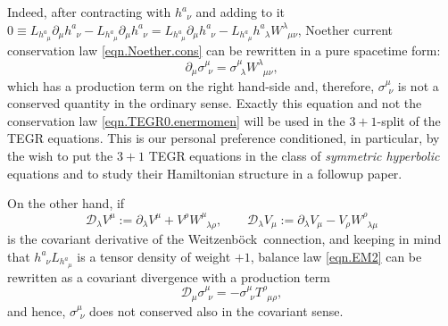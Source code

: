 \documentclass[
10pt, %
a4paper, %
oneside, %
headinclude,footinclude, %
BCOR5mm, %
]{scrartcl}
\newcommand{\pd}[1]{\partial_{#1}}
\newcommand{\tetrsymbol}{h}
\newcommand{\tetr}[2]{\tetrsymbol^{#1}_{\phantom{#1}#2}}
\newcommand{\DW}[1]{\mathcal{D}_{#1}} %
\newcommand{\Tors}[2]{T^{#1}_{\phantom{a}#2}}
\newcommand{\w}[2]{W^{#1}_{\phantom{#1}#2}}
\newcommand{\We}{Weitzenb\"ock}
\newcommand{\Laghodge}{L}%
\newcommand{\EMmat}[2]{\sigma^{#1}_{\ \,#2}}
\begin{document}
Indeed, after contracting with $ \tetr{a}{\nu} $ and adding to it $ 
0\equiv \Laghodge_{\tetr{a}{\mu}}\pd{\mu} \tetr{a}{\nu} - \Laghodge_{\tetr{a}{\mu}}\pd{\mu} 
\tetr{a}{\nu}  = \Laghodge_{\tetr{a}{\mu}}\pd{\mu} \tetr{a}{\nu} - \Laghodge_{\tetr{a}{\mu}} 
\tetr{a}{\lambda}\w{\lambda}{\mu\nu} $, Noether current conservation law 
\eqref{eqn.Noether.cons} can be rewritten in a pure 
spacetime 
form:	
\begin{equation}\label{eqn.EM2}
	\pd{\mu}\EMmat{\mu}{\nu} = \EMmat{\mu}{\lambda} 
	\w{\lambda}{\mu\nu},
\end{equation}
which has a production term on the right hand-side and, therefore, $ \EMmat{\mu}{\nu} $ is not 
a 
conserved 
quantity in the ordinary sense. Exactly this equation and not the conservation law 
\eqref{eqn.TEGR0.enermomen} will be used in the $ 3+1 $-split of the TEGR equations. This is our 
personal preference conditioned, in particular, by the wish to put the $ 3+1 $ TEGR equations in 
the class of \emph{symmetric hyperbolic} equations and to study their Hamiltonian structure 
\cite{SHTC-GENERIC-CMAT,PKG_Book2018} in a followup paper.

On the other hand, if 
\begin{equation}\label{eqn.cov.W}
	\DW{\lambda} V^{\mu} := \pd{\lambda} V^\mu + V^\rho \w{\mu}{\lambda\rho}, 
	\qquad 
	\DW{\lambda} V_{\mu} := \pd{\lambda} V_\mu - V_\rho \w{\rho}{\lambda\mu}
\end{equation}
is the covariant derivative of the \We\ connection, and 
keeping in mind that $ \tetr{a}{\nu}\Laghodge_{\tetr{a}{\mu}} $ is a tensor density of weight $ 
+1 
$, balance law \eqref{eqn.EM2} can be rewritten as a covariant divergence with a production term
\begin{equation*}\label{eqn.EM.cov}
	\DW{\mu}\EMmat{\mu}{\nu} = -\EMmat{\mu}{\nu} \Tors{\rho}{\mu\rho},
\end{equation*}
and hence, $ \EMmat{\mu}{\nu} $ does not conserved also in the covariant sense.
\end{document}
